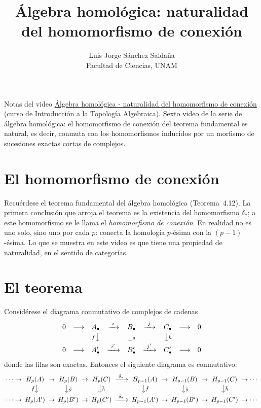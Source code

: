 \documentclass[11pt]{article}
\title{Álgebra homológica: naturalidad del homomorfismo de conexión}
\author{Luis Jorge Sánchez Saldaña\\[2pt]\small Facultad de Ciencias, UNAM}
\date{}
\begin{document}
\maketitle

\noindent\small Notas del video
\href{https://www.youtube.com/watch?v=hNERPd9viGc}{\guillemotleft{}Álgebra homológica - naturalidad del homomorfismo de conexión\guillemotright{}}
(curso de Introducción a la Topología Algebraica). Sexto video de la serie de álgebra homológica: el homomorfismo de conexión del teorema fundamental es natural, es decir, conmuta con los homomorfismos inducidos por un morfismo de sucesiones exactas cortas de complejos.
\normalsize

\section*{El homomorfismo de conexión}

Recuérdese el teorema fundamental del álgebra homológica (Teorema~4.12). La primera conclusión que arroja el teorema es la existencia del homomorfismo $\delta_*$; a este homomorfismo se le llama el \emph{homomorfismo de conexión}. En realidad no es uno solo, sino uno por cada $p$: conecta la homología $p$-ésima con la $(p-1)$-ésima. Lo que se muestra en este video es que tiene una propiedad de naturalidad, en el sentido de categorías.

\section*{El teorema}

\begin{teo}\label{teo:naturalidad}
Considérese el diagrama conmutativo de complejos de cadenas
\[
  \begin{array}{ccccccccc}
    0 & \longrightarrow & A_\bullet & \xrightarrow{\ i\ } & B_\bullet & \xrightarrow{\ j\ } & C_\bullet & \longrightarrow & 0\\[2pt]
    & & {\scriptstyle f}\big\downarrow & & \big\downarrow{\scriptstyle g} & & \big\downarrow{\scriptstyle h} & & \\[2pt]
    0 & \longrightarrow & A'_\bullet & \xrightarrow{\ i'\ } & B'_\bullet & \xrightarrow{\ j'\ } & C'_\bullet & \longrightarrow & 0
  \end{array}
\]
donde las filas son exactas. Entonces el siguiente diagrama es conmutativo:
\[
  \setlength{\arraycolsep}{2.5pt}
  \begin{array}{ccccccccccccc}
    \cdots\to & H_p(A) & \to & H_p(B) & \to & H_p(C) & \xrightarrow{\ \delta_*\ } & H_{p-1}(A) & \to & H_{p-1}(B) & \to & H_{p-1}(C) & \to\cdots\\[2pt]
    & {\scriptstyle\bar f}\big\downarrow & & \big\downarrow{\scriptstyle\bar g} & & \big\downarrow{\scriptstyle\bar h} & & \big\downarrow{\scriptstyle\bar f} & & \big\downarrow{\scriptstyle\bar g} & & \big\downarrow{\scriptstyle\bar h} & \\[2pt]
    \cdots\to & H_p(A') & \to & H_p(B') & \to & H_p(C') & \xrightarrow{\ \delta_*\ } & H_{p-1}(A') & \to & H_{p-1}(B') & \to & H_{p-1}(C') & \to\cdots
  \end{array}
\]
\end{teo}
\end{document}
